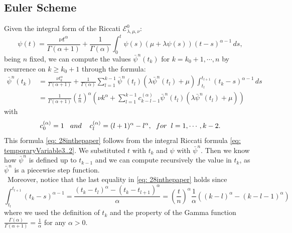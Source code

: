\documentclass[a4paper,italian,11pt]{book}
\theoremstyle{plain}
\theoremstyle{remark}
\theoremstyle{plain}
\begin{document}
\subsection{Euler Scheme}
\label{subsection: secondpsin}
\noindent
Given the integral form of the Riccati $\mathcal{E}^0_{\lambda, \mu, \nu}$:
\begin{equation}
    \label{eq: temporaryVariable3..2}
    \psi(t) = \frac{\nu t^\alpha}{ \Gamma(\alpha+1)} + \frac{1}{\Gamma(\alpha)} \int_0^t \psi(s) (\mu + \lambda \psi(s)) (t-s) ^ {\alpha - 1} \,ds,
\end{equation}
being $n$ fixed, we can compute the values $\bar{\psi}^n (t_k)$ for $k=k_0+1, \cdots , n$ by recurrence on $k\ge k_0+1$ through the formula:
\begin{equation}
\label{eq: 28inthepaper}
\begin{aligned}
    \bar{\psi}^n(t_k) &= \frac{\nu t_k^\alpha}{\Gamma(\alpha+1)} + \frac{1}{\Gamma(\alpha)} \sum_{l=1}^{k-1} \bar{\psi}^n(t_l) \left( \lambda \bar{\psi}^n(t_l) + \mu \right) \int_{t_l}^{t_{l+1}} (t_k - s)^{\alpha - 1} \, ds
    \\
    &= \frac{1}{\Gamma(\alpha + 1)} \left( \frac{t}{n}\right)^\alpha \left( \nu k^\alpha + \sum_{l=1}^{k-1} c_{k-l-1}^{(\alpha)}  \bar{\psi}^n(t_l) \left( \lambda \bar{\psi}^n(t_l) + \mu \right) \right)
    
\end{aligned}
\end{equation}
with
\begin{equation*}
    c_0^{(\alpha)} = 1 \hspace{0.3cm} and \hspace{0.4cm} c_l^{(\alpha)} = (l+1)^\alpha -l^\alpha, \hspace{0.2cm} for \hspace{0.2cm} l=1,\cdots, k-2.
\end{equation*}
This formula \eqref{eq: 28inthepaper} follows from the integral Riccati formula \eqref{eq: temporaryVariable3..2}. We substituted $t$ with $t_k$ and $\psi$ with $\bar{\psi}^n$. Then we know how $\bar{\psi}^n$ is defined up to $t_{k-1}$ and we can compute recursively the value in $t_k$, as $\bar{\psi}^n$ is a piecewise step function. \\\
Moreover, notice that the last equality in \eqref{eq: 28inthepaper} holds since
$$ \int_{t_l} ^ {t_{l+1}} (t_k - s ) ^ {\alpha -1} = \frac{(t_k-t_l)^\alpha - (t_k-t_{l+1})^\alpha}{ \alpha} = \left( \frac{t}{n}\right)^\alpha \frac{1}{\alpha} \left(  (k-l)^\alpha - (k-l-1)^\alpha \right)$$
where we used the definition of $t_k$ and the property of the Gamma function $\frac{\Gamma(\alpha)}{\Gamma(\alpha+1)} = \frac{1}{\alpha}$ for any $\alpha >0$.
\end{document}
